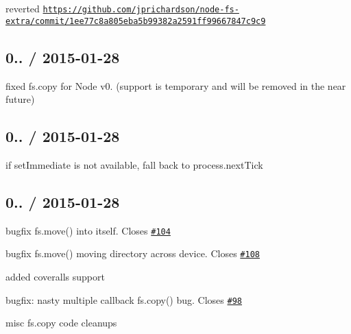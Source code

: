 \begin{DoxyItemize}
\item reverted \href{https://github.com/jprichardson/node-fs-extra/commit/1ee77c8a805eba5b99382a2591ff99667847c9c9}{\tt https\+://github.\+com/jprichardson/node-\/fs-\/extra/commit/1ee77c8a805eba5b99382a2591ff99667847c9c9}
\end{DoxyItemize}

\subsection*{0.. / 2015-\/01-\/28 }


\begin{DoxyItemize}
\item fixed {\ttfamily fs.\+copy} for Node v0. (support is temporary and will be removed in the near future)
\end{DoxyItemize}

\subsection*{0.. / 2015-\/01-\/28 }


\begin{DoxyItemize}
\item if {\ttfamily set\+Immediate} is not available, fall back to {\ttfamily process.\+next\+Tick}
\end{DoxyItemize}

\subsection*{0.. / 2015-\/01-\/28 }


\begin{DoxyItemize}
\item bugfix {\ttfamily fs.\+move()} into itself. Closes \href{https://github.com/jprichardson/node-fs-extra/issues/104}{\tt \#104}
\item bugfix {\ttfamily fs.\+move()} moving directory across device. Closes \href{https://github.com/jprichardson/node-fs-extra/issues/108}{\tt \#108}
\item added coveralls support
\item bugfix\+: nasty multiple callback {\ttfamily fs.\+copy()} bug. Closes \href{https://github.com/jprichardson/node-fs-extra/issues/98}{\tt \#98}
\item misc fs.\+copy code cleanups
\end{DoxyItemize}

